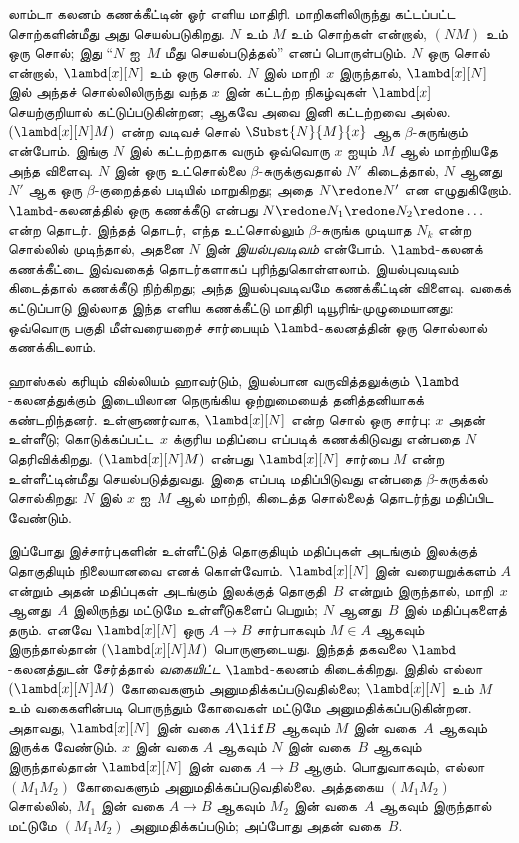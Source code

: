 \documentclass[../../../include/open-logic-section]{subfiles}
\begin{document}


லாம்டா கலனம் கணக்கீட்டின் ஓர் எளிய மாதிரி. மாறிகளிலிருந்து
கட்டப்பட்ட சொற்களின்மீது அது செயல்படுகிறது. $N$ உம் $M$
உம் சொற்கள் என்றால், $(NM)$ உம் ஒரு சொல்; இது
``$N$ ஐ~$M$ மீது செயல்படுத்தல்'' எனப் பொருள்படும்.
$N$ ஒரு சொல் என்றால், $\lambd[x][N]$ உம் ஒரு சொல்.
$N$ இல் மாறி~$x$ இருந்தால், $\lambd[x][N]$ இல்
அந்தச் சொல்லிலிருந்து வந்த $x$ இன் கட்டற்ற நிகழ்வுகள்
$\lambd[x]$ செயற்குறியால் கட்டுப்படுகின்றன; ஆகவே அவை
இனி கட்டற்றவை அல்ல. $(\lambd[x][N]M)$ என்ற வடிவச் சொல்
$\Subst{N}{M}{x}$ ஆக $\beta$-சுருங்கும் என்போம்.
இங்கு $N$ இல் கட்டற்றதாக வரும் ஒவ்வொரு $x$ ஐயும்
$M$ ஆல் மாற்றியதே அந்த விளைவு.
$N$ இன் ஒரு உட்சொல்லை $\beta$-சுருக்குவதால் $N'$
கிடைத்தால், $N$ ஆனது~$N'$ ஆக ஒரு $\beta$-குறைத்தல்
படியில் மாறுகிறது; அதை $N \redone N'$ என எழுதுகிறோம்.
$\lambd$-கலனத்தில் ஒரு கணக்கீடு என்பது
$N \redone N_1 \redone N_2 \redone \dots$ என்ற தொடர்.
இந்தத் தொடர், எந்த உட்சொல்லும் $\beta$-சுருங்க முடியாத
$N_k$ என்ற சொல்லில் முடிந்தால், அதனை $N$ இன்
\emph{இயல்புவடிவம்} என்போம். $\lambd$-கலனக் கணக்கீட்டை
இவ்வகைத் தொடர்களாகப் புரிந்துகொள்ளலாம். இயல்புவடிவம்
கிடைத்தால் கணக்கீடு நிற்கிறது; அந்த இயல்புவடிவமே
கணக்கீட்டின் விளைவு. வகைக் கட்டுப்பாடு இல்லாத இந்த
எளிய கணக்கீட்டு மாதிரி டியூரிங்-முழுமையானது: ஒவ்வொரு
பகுதி மீள்வரையறைச் சார்பையும் $\lambd$-கலனத்தின்
ஒரு சொல்லால் கணக்கிடலாம்.

ஹாஸ்கல் கரியும் வில்லியம் ஹாவர்டும், இயல்பான
வருவித்தலுக்கும் $\lambd$-கலனத்துக்கும் இடையிலான
நெருங்கிய ஒற்றுமையைத் தனித்தனியாகக் கண்டறிந்தனர்.
உள்ளுணர்வாக, $\lambd[x][N]$ என்ற சொல் ஒரு சார்பு:
$x$ அதன் உள்ளீடு; கொடுக்கப்பட்ட~$x$ க்குரிய மதிப்பை
எப்படிக் கணக்கிடுவது என்பதை $N$ தெரிவிக்கிறது.
$(\lambd[x][N]M)$ என்பது $\lambd[x][N]$ சார்பை
$M$ என்ற உள்ளீட்டின்மீது செயல்படுத்துவது. இதை எப்படி
மதிப்பிடுவது என்பதை $\beta$-சுருக்கல் சொல்கிறது:
$N$ இல் $x$ ஐ~$M$ ஆல் மாற்றி, கிடைத்த சொல்லைத்
தொடர்ந்து மதிப்பிட வேண்டும்.

இப்போது இச்சார்புகளின் உள்ளீட்டுத் தொகுதியும்
மதிப்புகள் அடங்கும் இலக்குத் தொகுதியும் நிலையானவை
எனக் கொள்வோம். $\lambd[x][N]$ இன் வரையறுக்களம் $A$
என்றும் அதன் மதிப்புகள் அடங்கும் இலக்குத் தொகுதி~$B$
என்றும் இருந்தால், மாறி~$x$ ஆனது~$A$ இலிருந்து
மட்டுமே உள்ளீடுகளைப் பெறும்; $N$ ஆனது~$B$ இல்
மதிப்புகளைத் தரும். எனவே $\lambd[x][N]$ ஒரு
$A \to B$ சார்பாகவும் $M \in A$ ஆகவும் இருந்தால்தான்
$(\lambd[x][N]M)$ பொருளுடையது. இந்தத் தகவலை
$\lambd$-கலனத்துடன் சேர்த்தால் \emph{வகையிட்ட}
$\lambd$-கலனம் கிடைக்கிறது. இதில் எல்லா
$(\lambd[x][N]M)$ கோவைகளும் அனுமதிக்கப்படுவதில்லை;
$\lambd[x][N]$ உம் $M$ உம் வகைகளின்படி பொருந்தும்
கோவைகள் மட்டுமே அனுமதிக்கப்படுகின்றன. அதாவது,
$\lambd[x][N]$ இன் வகை $A \lif B$ ஆகவும்
$M$ இன் வகை~$A$ ஆகவும் இருக்க வேண்டும்.
$x$ இன் வகை $A$ ஆகவும் $N$ இன் வகை~$B$ ஆகவும்
இருந்தால்தான் $\lambd[x][N]$ இன் வகை $A \to B$
ஆகும். பொதுவாகவும், எல்லா $(M_1M_2)$ கோவைகளும்
அனுமதிக்கப்படுவதில்லை. அத்தகைய $(M_1M_2)$ சொல்லில்,
$M_1$ இன் வகை $A \to B$
ஆகவும் $M_2$ இன் வகை~$A$ ஆகவும் இருந்தால் மட்டுமே
$(M_1M_2)$ அனுமதிக்கப்படும்; அப்போது அதன் வகை~$B$.
\end{document}
